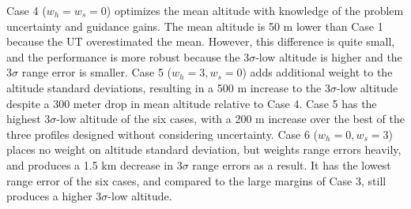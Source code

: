 Case 4 ($ w_h=w_s=0 $) optimizes the mean altitude with knowledge of the problem uncertainty and guidance gains. The mean altitude is 50 m lower than Case 1 because the UT overestimated the mean. However, this difference is quite small, and the performance is more robust because the 3$\sigma$-low altitude is higher and the 3$\sigma$ range error is smaller. Case 5 ($ w_h=3,w_s=0 $) adds additional weight to the altitude standard deviations, resulting in a 500 m increase to the 3$\sigma$-low altitude despite a 300 meter drop in mean altitude relative to Case 4. Case 5 has the highest 3$\sigma$-low altitude of the six cases, with a 200 m increase over the best of the three profiles designed without considering uncertainty. Case 6 ($ w_h=0, w_s=3$) places no weight on altitude standard deviation, but weights range errors heavily, and produces a 1.5 km decrease in 3$\sigma$ range errors as a result. It has the lowest range error of the six cases, and compared to the large margins of Case 3, still produces a higher 3$\sigma$-low altitude.

